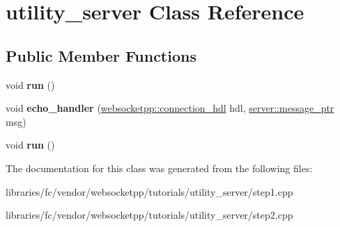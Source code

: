 \hypertarget{classutility__server}{}\section{utility\+\_\+server Class Reference}
\label{classutility__server}
\subsection*{Public Member Functions}
\begin{DoxyCompactItemize}
\item 
\mbox{\label{classutility__server_a86f83e6b79b082f181c7d5edbb6b6324}} 
void {\bfseries run} ()
\item 
\mbox{\label{classutility__server_a34dbd3789ee5ef7c1918e4ff9d154a15}} 
void {\bfseries echo\+\_\+handler} (\mbox{\hyperlink{namespacewebsocketpp_a6b3d26a10ee7229b84b776786332631d}{websocketpp\+::connection\+\_\+hdl}} hdl, \mbox{\hyperlink{classwebsocketpp_1_1endpoint_a585ecbbfd9689d4e4229e4c8378bd672}{server\+::message\+\_\+ptr}} msg)
\item 
\mbox{\label{classutility__server_a86f83e6b79b082f181c7d5edbb6b6324}} 
void {\bfseries run} ()
\end{DoxyCompactItemize}


The documentation for this class was generated from the following files\+:\begin{DoxyCompactItemize}
\item 
libraries/fc/vendor/websocketpp/tutorials/utility\+\_\+server/step1.\+cpp\item 
libraries/fc/vendor/websocketpp/tutorials/utility\+\_\+server/step2.\+cpp\end{DoxyCompactItemize}
